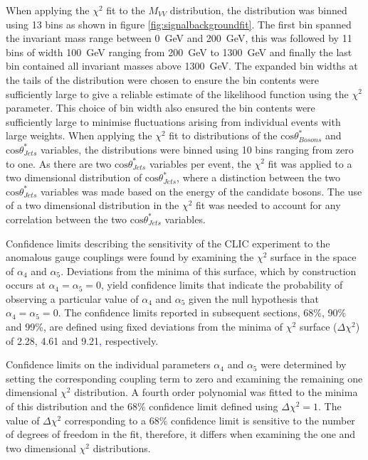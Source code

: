 When applying the $\chi^{2}$ fit to the $M_{VV}$ distribution, the distribution was binned using 13 bins as shown in figure \ref{fig:signalbackgroundfit}.  The first bin spanned the invariant mass range between 0~GeV and 200~GeV, this was followed by 11 bins of width 100~GeV ranging from 200~GeV to 1300~GeV and finally the last bin contained all invariant masses above 1300~GeV.  The expanded bin widths at the tails of the distribution were chosen to ensure the bin contents were sufficiently large to give a reliable estimate of the likelihood function using the $\chi^{2}$ parameter.  This choice of bin width also ensured the bin contents were sufficiently large to minimise fluctuations arising from individual events with large weights.  When applying the $\chi^{2}$ fit to distributions of the $\text{cos}\theta^{*}_{Bosons}$ and $\text{cos}\theta^{*}_{Jets}$ variables, the distributions were binned using 10 bins ranging from zero to one.  As there are two $\text{cos}\theta^{*}_{Jets}$ variables per event, the $\chi^{2}$ fit was applied to a two dimensional distribution of $\text{cos}\theta^{*}_{Jets}$, where a distinction between the two $\text{cos}\theta^{*}_{Jets}$ variables was made based on the energy of the candidate bosons.  The use of a two dimensional distribution in the $\chi^{2}$ fit was needed to account for any correlation between the two $\text{cos}\theta^{*}_{Jets}$ variables.  

Confidence limits describing the sensitivity of the CLIC experiment to the anomalous gauge couplings were found by examining the $\chi^{2}$ surface in the space of $\alpha_{4}$ and $\alpha_{5}$.  Deviations from the minima of this surface, which by construction occurs at $\alpha_{4} = \alpha_{5} = 0$, yield confidence limits that indicate the probability of observing a particular value of $\alpha_{4}$ and $\alpha_{5}$ given the null hypothesis that $\alpha_{4} = \alpha_{5} = 0$.  The confidence limits reported in subsequent sections, 68\%, 90\% and 99\%, are defined using fixed deviations from the minima of $\chi^{2}$ surface ($\Delta\chi^{2}$) of 2.28, 4.61 and 9.21\textcolor{blue}{,} respectively.

Confidence limits on the individual parameters $\alpha_{4}$ and $\alpha_{5}$ were determined by setting the corresponding coupling term to zero and examining the remaining one dimensional $\chi^{2}$ distribution.  A fourth order polynomial was fitted to the minima of this distribution and the 68\% confidence limit defined using $\Delta\chi^{2} = 1$.  The value of $\Delta\chi^{2}$ corresponding to a 68\% confidence limit is sensitive to the number of degrees of freedom in the fit, therefore, it differs when examining the one and two dimensional $\chi^{2}$ distributions.  

